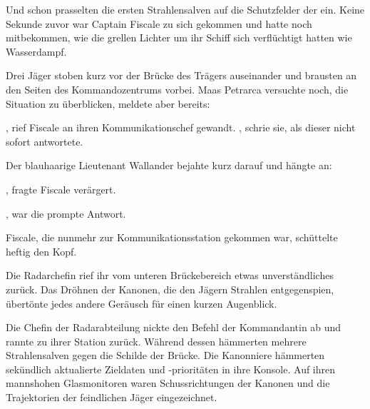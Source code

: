 Und schon prasselten die ersten Strahlensalven auf die Schutzfelder der  ein. Keine Sekunde zuvor war Captain Fiscale zu sich gekommen und hatte noch mitbekommen, wie die grellen Lichter um ihr Schiff sich verflüchtigt hatten wie Wasserdampf.

\par

Drei Jäger stoben kurz vor der Brücke des Trägers auseinander und brausten an den Seiten des Kommandozentrums vorbei. Maas Petrarca versuchte noch, die Situation zu überblicken, meldete aber bereits: 

\par

, rief Fiscale an ihren Kommunikationschef gewandt. , schrie sie, als dieser nicht sofort antwortete.

\par

Der blauhaarige Lieutenant Wallander bejahte kurz darauf und hängte an: 

\par

, fragte Fiscale verärgert.

\par

, war die prompte Antwort. 

\par

Fiscale, die nunmehr zur Kommunikationsstation gekommen war, schüttelte heftig den Kopf. 

\par

Die Radarchefin rief ihr vom unteren Brückebereich etwas unverständliches zurück. Das Dröhnen der Kanonen, die den Jägern Strahlen entgegenspien, übertönte jedes andere Geräusch für einen kurzen Augenblick.

\par

 Die Chefin der Radarabteilung nickte den Befehl der Kommandantin ab und rannte zu ihrer Station zurück. Während dessen hämmerten mehrere Strahlensalven gegen die Schilde der Brücke. Die Kanonniere hämmerten sekündlich aktualierte Zieldaten und -prioritäten in ihre Konsole. Auf ihren mannshohen Glasmonitoren waren Schussrichtungen der Kanonen und die Trajektorien der feindlichen Jäger eingezeichnet.

